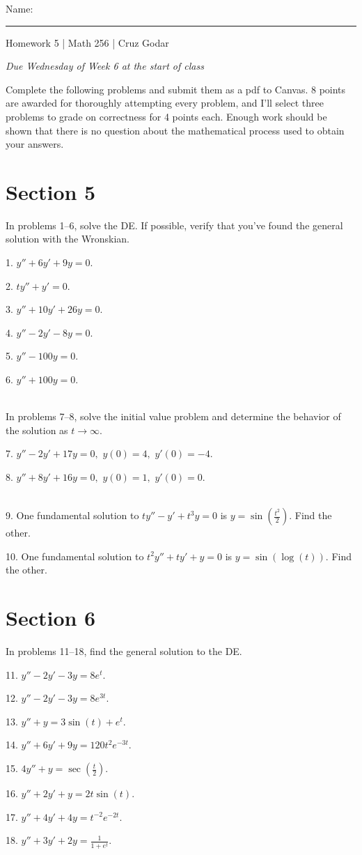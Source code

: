 \documentclass{article}
\begin{document}
\Large Name: \rule{2in}{0.15mm} \hfill Homework 5 | Math 256 | Cruz Godar \vspace{4pt} \normalsize

\textit{Due Wednesday of Week 6 at the start of class}

Complete the following problems and submit them as a pdf to Canvas. 8 points are awarded for thoroughly attempting every problem, and I'll select three problems to grade on correctness for 4 points each. Enough work should be shown that there is no question about the mathematical process used to obtain your answers.

\section{Section 5}

In problems 1--6, solve the DE. If possible, verify that you've found the general solution with the Wronskian.

1. $\displaystyle y'' + 6y' + 9y = 0.$

2. $\displaystyle ty'' + y' = 0.$

3. $\displaystyle y'' + 10y' + 26y = 0.$

4. $\displaystyle y'' - 2y' - 8y = 0.$

5. $\displaystyle y'' - 100y = 0.$

6. $\displaystyle y'' + 100y = 0.$

~\\

In problems 7--8, solve the initial value problem and determine the behavior of the solution as $t \to \infty$.

7. $\displaystyle y'' - 2y' + 17y = 0,$ $\displaystyle y(0) = 4,$ $\displaystyle y'(0) = -4.$

8. $\displaystyle y'' + 8y' + 16y = 0,$ $\displaystyle y(0) = 1,$ $\displaystyle y'(0) = 0.$

~\\

9. One fundamental solution to $\displaystyle ty'' - y' + t^3y = 0$ is $y = \sin\left(\frac{t^2}{2}\right)$. Find the other.

10. One fundamental solution to $\displaystyle t^2y'' + ty' + y = 0$ is $y = \sin(\log(t))$. Find the other.

\section{Section 6}

In problems 11--18, find the general solution to the DE.

11. $\displaystyle y'' - 2y' - 3y = 8e^t.$

12. $\displaystyle y'' - 2y' - 3y = 8e^{3t}.$

13. $\displaystyle y'' + y = 3\sin(t) + e^t.$

14. $\displaystyle y'' + 6y' + 9y = 120t^2e^{-3t}.$

15. $\displaystyle 4y'' + y = \sec\left(\frac{t}{2}\right).$

16. $\displaystyle y'' + 2y' + y = 2t\sin(t).$

17. $\displaystyle y'' + 4y' + 4y = t^{-2} e^{-2t}.$

18. $\displaystyle y'' + 3y' + 2y = \frac{1}{1 + e^t}.$
\end{document}
